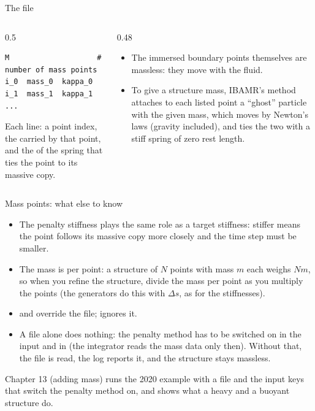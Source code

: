 \documentclass[aspectratio=169,11pt]{beamer}
\begin{document}
\begin{frame}[fragile]{The  file}
\begin{columns}[T,onlytextwidth]
\begin{column}{0.5\textwidth}
\begin{lstlisting}[style=data]
M                    # number of mass points
i_0  mass_0  kappa_0
i_1  mass_1  kappa_1
...
\end{lstlisting}
\small Each line: a point index, the  carried by that point, and the  of the spring that ties the point to its massive copy.
\end{column}
\begin{column}{0.48\textwidth}
\small
\begin{itemize}
  \item The immersed boundary points themselves are massless: they move with the fluid.
  \item To give a structure mass, IBAMR's  method attaches to each listed point a ``ghost'' particle with the given mass, which moves by Newton's laws (gravity included), and ties the two with a stiff spring of zero rest length.
\end{itemize}
\end{column}
\end{columns}
\end{frame}

\begin{frame}{Mass points: what else to know}
\begin{itemize}
  \item The penalty stiffness plays the same role as a target stiffness: stiffer means the point follows its massive copy more closely and the time step must be smaller.
  \item The mass is per point: a structure of $N$ points with mass $m$ each weighs $Nm$, so when you refine the structure, divide the mass per point as you multiply the points (the generators do this with $\Delta s$, as for the stiffnesses).
  \item {} and  override the file;  ignores it.
  \item A  file alone does nothing: the penalty method has to be switched on in the input and in  (the integrator reads the mass data only then). Without that, the file is read, the log reports it, and the structure stays massless.
\end{itemize}
\vspace{2mm}
\begin{punchbox}
\small Chapter 13 (adding mass) runs the 2020 example with a  file and the input keys that switch the penalty method on, and shows what a heavy and a buoyant structure do.
\end{punchbox}
\end{frame}
\end{document}
